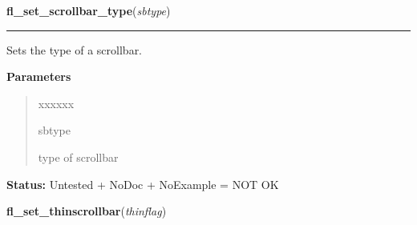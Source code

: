     \label{xformslib:library:fl_set_scrollbar_type}

    \vspace{0.5ex}

\hspace{.8\funcindent}\begin{boxedminipage}{\funcwidth}

    \raggedright \textbf{fl\_set\_scrollbar\_type}(\textit{sbtype})

    \vspace{-1.5ex}

    \rule{\textwidth}{0.5\fboxrule}
\setlength{\parskip}{2ex}
    Sets the type of a scrollbar.

\setlength{\parskip}{1ex}
      \textbf{Parameters}
      \vspace{-1ex}

      \begin{quote}
        \begin{Ventry}{xxxxxx}

          \item[sbtype]

          type of scrollbar

        \end{Ventry}

      \end{quote}

\textbf{Status:} Untested + NoDoc + NoExample = NOT OK



    \end{boxedminipage}

    \label{xformslib:library:fl_set_thinscrollbar}

    \vspace{0.5ex}

\hspace{.8\funcindent}\begin{boxedminipage}{\funcwidth}

    \raggedright \textbf{fl\_set\_thinscrollbar}(\textit{thinflag})

\setlength{\parskip}{2ex}
\setlength{\parskip}{1ex}
    \end{boxedminipage}

    \label{xformslib:library:fl_flip_yorigin}

